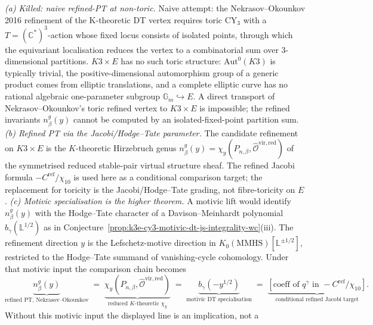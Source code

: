 \begin{remark}
\label{rem:k3e-cy3-refined-pt}
\emph{(a) Killed: naive refined-PT at non-toric.} Naive attempt: the Nekrasov--Okounkov 2016 refinement of the K-theoretic DT vertex requires toric CY$_3$ with a $T = (\mathbb C^{*})^{3}$-action whose fixed locus consists of isolated points, through which the equivariant localisation reduces the vertex to a combinatorial sum over $3$-dimensional partitions. $K3 \times E$ has no such toric structure: $\mathrm{Aut}^{0}(K3)$ is typically trivial, the positive-dimensional automorphism group of a generic product comes from elliptic translations, and a complete elliptic curve has no rational algebraic one-parameter subgroup $\mathbb G_m \hookrightarrow E$. A direct transport of Nekrasov--Okounkov's toric refined vertex to $K3 \times E$ is impossible; the refined invariants $n^{g}_{\beta}(y)$ cannot be computed by an isolated-fixed-point partition sum.
\emph{(b) Refined PT via the Jacobi/Hodge--Tate parameter.} The
candidate refinement on \(K3\times E\) is the
\(K\)-theoretic Hirzebruch genus
\(n^g_\beta(y)=\chi_y(P_{n,\beta},
\widehat{\mathcal O}^{\mathrm{vir,red}})\) of the symmetrised reduced
stable-pair virtual structure sheaf. The refined Jacobi formula
\(-C^{\mathrm{ref}}/\chi_{10}\) is used here as a conditional
comparison target; the replacement for toricity is the
Jacobi/Hodge--Tate grading, not fibre-toricity on \(E\).
\emph{(c) Motivic specialisation is the higher theorem.} A motivic lift
would identify \(n^g_\beta(y)\) with the Hodge--Tate character of a
Davison--Meinhardt polynomial
\(b_\gamma(\mathbb L^{1/2})\) as in
Conjecture~\ref{prop:k3e-cy3-motivic-dt-js-integrality-wc}(iii). The
refinement direction \(y\) is the Lefschetz-motive direction in
\(K_0(\mathrm{MMHS})[\mathbb L^{\pm1/2}]\), restricted to the
Hodge--Tate summand of vanishing-cycle cohomology. Under that motivic
input the comparison chain becomes
\[
 \underbrace{n^{g}_{\beta}(y)}_{\text{refined PT, Nekrasov--Okounkov}} \;=\; \underbrace{\chi_{y}(P_{n, \beta}, \widehat{\mathcal O}^{\mathrm{vir, red}})}_{\text{reduced }K\text{-theoretic }\chi_y} \;=\; \underbrace{b_{\gamma}(-y^{1/2})}_{\text{motivic DT specialisation}} \;=\; \underbrace{[\text{coeff of } q^{\gamma} \text{ in } -C^{\mathrm{ref}}/\chi_{10}]}_{\text{conditional refined Jacobi target}}.
\]
Without this motivic input the displayed line is an implication, not a

\end{remark}
